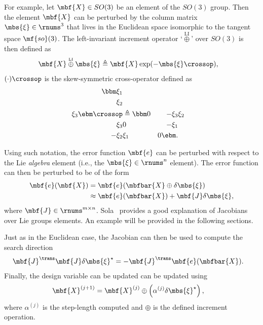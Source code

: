 \documentclass[ nobib, nofonts, notoc]{tufte-handout}
\newcommand{\liplus}{\overset{{\scriptscriptstyle\mathrm{LI}}}{\oplus}}
\begin{document}
    For example, let $\mbf{X}\in SO(3)$ be an element of the $SO(3)$ group.
    Then the element $\mbf{X}$ can be perturbed by the column matrix $\mbs{\xi}\in\rnums^{3}$ that lives in the Euclidean space isomorphic to the tangent space $\mf{so}(3)$.
    The left-invariant increment operator `$\liplus$' over $SO(3)$ is then defined as
    \begin{align}
        \mbf{X} \liplus \mbs{\xi} &\triangleq \mbf{X}\exp(-\mbs{\xi}\crossop),
    \end{align}
     $(\cdot)\crossop$ is the skew-symmetric cross-operator defined as \cite{Barfoot_State_2017a}
    \begin{align}
        \bbm
            \xi_{1}\\
            \xi_{2}\\
            \xi_{3}
        \ebm\crossop
        &\triangleq
        \bbm
            0 & -\xi_{3} & \xi_{2} \\
            \xi_{3} & 0 & -\xi_{1}\\
            -\xi_{2} & \xi_{1} & 0
        \ebm.
    \end{align}

    Using such notation, the error function $\mbf{e}$ can be perturbed with respect to the Lie \emph{algebra} element (i.e., the $\mbs{\xi}\in\rnums^{n}$ element).
    The error function can then be perturbed to be of the form
    \begin{align}
        \mbf{e}(\mbf{X})
        &= \mbf{e}(\mbfbar{X}\oplus \delta\mbs{\xi})\\
        &\approx \mbf{e}(\mbfbar{X}) + \mbf{J}\delta\mbs{\xi},
    \end{align}
    where $\mbf{J}\in\rnums^{m\times n}$.
    Sola~\cite{Sola_micro_2019} provides a good explanation of Jacobians over Lie groups elements.
    An example will be provided in the following sections.

    Just as in the Euclidean case, the Jacobian can then be used to compute the search direction
    \begin{align}
        \mbf{J}^{\trans}\mbf{J}\delta\mbs{\xi}^{\star} &= -\mbf{J}^{\trans}\mbf{e}(\mbfbar{X}).
    \end{align}
    Finally, the design variable can be updated can be updated using
    \begin{align}
        \mbf{X}^{(j+1)} &= \mbf{X}^{(j)}\oplus \left( \alpha^{(j)}\delta\mbs{\xi}^{\star} \right),
    \end{align}
    where $\alpha^{(j)}$ is the step-length computed and $\oplus$ is the defined increment operation.
\end{document}
